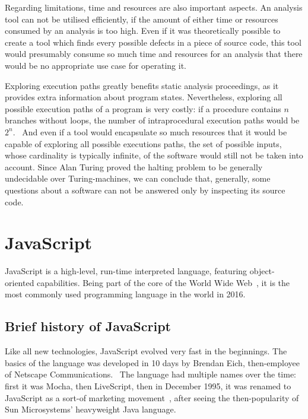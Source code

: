 Regarding limitations, time and resources are also important aspects. An analysis tool can not be utilised efficiently, if the amount of either time or resources consumed by an analysis is too high. Even if it was theoretically possible to create a tool which finds every possible defects in a piece of source code, this tool would presumably consume so much time and resources for an analysis that there would be no appropriate use case for operating it.~\cite{anderson2008use}

Exploring execution paths greatly benefits static analysis proceedings, as it provides extra information about program states. Nevertheless, exploring all possible execution paths of a program is very costly: if a procedure contains $n$ branches without loops, the number of intraprocedural execution paths would be $2^n$.~\cite{anderson2008use} And even if a tool would encapsulate so much resources that it would be capable of exploring all possible executions paths, the set of possible inputs, whose cardinality is typically infinite, of the software would still not be taken into account. Since Alan Turing proved the halting problem to be generally undecidable over Turing-machines, we can conclude that, generally, some questions about a software can not be answered only by inspecting its source code.


\section{JavaScript}

JavaScript is a high-level, run-time interpreted language, featuring object-oriented capabilities. Being part of the core of the World Wide Web~\cite{flanagan2006javascript}, it is the most commonly used programming language in the world in 2016.~\cite{javascriptstackoverflow}


\subsection{Brief history of JavaScript}

Like all new technologies, JavaScript evolved very fast in the beginnings. The basics of the language was developed in 10 days by Brendan Eich, then-employee of Netscape Communications.~\cite{10.1109/MC.2012.57} The language had multiple names over the time: first it was Mocha, then LiveScript, then in December 1995, it was renamed to JavaScript as a sort-of marketing movement~\cite{webedjavascripthistory}, after seeing the then-popularity of Sun Microsystems' heavyweight Java language.

